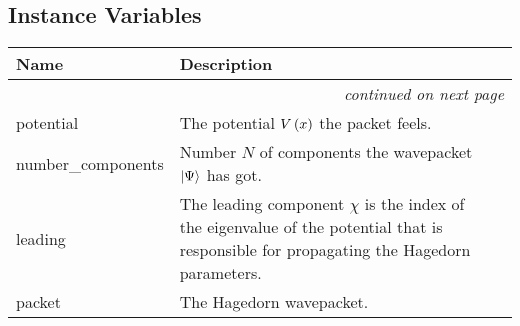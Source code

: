 
  \subsection{Instance Variables}

    \vspace{-1cm}
\hspace{\varindent}\begin{longtable}{|p{\varnamewidth}|p{\vardescrwidth}|l}
\cline{1-2}
\cline{1-2} \centering \textbf{Name} & \centering \textbf{Description}& \\
\cline{1-2}
\endhead\cline{1-2}\multicolumn{3}{r}{\small\textit{continued on next page}}\\\endfoot\cline{1-2}
\endlastfoot\raggedright p\-o\-t\-e\-n\-t\-i\-a\-l\- & The potential $V\left( x \right)$ the packet feels.&\\
\cline{1-2}
\raggedright {number\_components} & Number $N$ of components the wavepacket
          $\Ket{\Psi}$ has got.&\\
\cline{1-2}
\raggedright l\-e\-a\-d\-i\-n\-g\- & The leading component $\chi$ is the index of the
          eigenvalue of the potential that is responsible for propagating
          the Hagedorn parameters.&\\
\cline{1-2}
\raggedright p\-a\-c\-k\-e\-t\- & The Hagedorn wavepacket.&\\
\cline{1-2}
\end{longtable}

